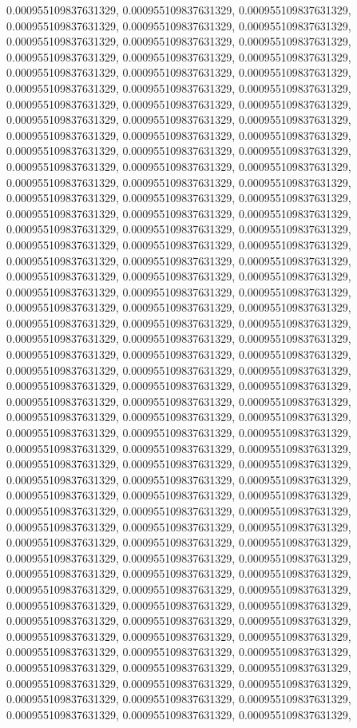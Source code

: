 \documentclass[
  ,man]{apa6}
\begin{document}
0.000955109837631329, 0.000955109837631329, 0.000955109837631329, 0.000955109837631329, 0.000955109837631329, 0.000955109837631329, 0.000955109837631329, 0.000955109837631329, 0.000955109837631329, 0.000955109837631329, 0.000955109837631329, 0.000955109837631329, 0.000955109837631329, 0.000955109837631329, 0.000955109837631329, 0.000955109837631329, 0.000955109837631329, 0.000955109837631329, 0.000955109837631329, 0.000955109837631329, 0.000955109837631329, 0.000955109837631329, 0.000955109837631329,
0.000955109837631329, 0.000955109837631329, 0.000955109837631329, 0.000955109837631329, 0.000955109837631329, 0.000955109837631329, 0.000955109837631329, 0.000955109837631329, 0.000955109837631329, 0.000955109837631329, 0.000955109837631329, 0.000955109837631329, 0.000955109837631329, 0.000955109837631329, 0.000955109837631329, 0.000955109837631329, 0.000955109837631329, 0.000955109837631329, 0.000955109837631329, 0.000955109837631329, 0.000955109837631329, 0.000955109837631329, 0.000955109837631329,
0.000955109837631329, 0.000955109837631329, 0.000955109837631329, 0.000955109837631329, 0.000955109837631329, 0.000955109837631329, 0.000955109837631329, 0.000955109837631329, 0.000955109837631329, 0.000955109837631329, 0.000955109837631329, 0.000955109837631329, 0.000955109837631329, 0.000955109837631329, 0.000955109837631329, 0.000955109837631329, 0.000955109837631329, 0.000955109837631329, 0.000955109837631329, 0.000955109837631329, 0.000955109837631329, 0.000955109837631329, 0.000955109837631329,
0.000955109837631329, 0.000955109837631329, 0.000955109837631329, 0.000955109837631329, 0.000955109837631329, 0.000955109837631329, 0.000955109837631329, 0.000955109837631329, 0.000955109837631329, 0.000955109837631329, 0.000955109837631329, 0.000955109837631329, 0.000955109837631329, 0.000955109837631329, 0.000955109837631329, 0.000955109837631329, 0.000955109837631329, 0.000955109837631329, 0.000955109837631329, 0.000955109837631329, 0.000955109837631329, 0.000955109837631329, 0.000955109837631329,
0.000955109837631329, 0.000955109837631329, 0.000955109837631329, 0.000955109837631329, 0.000955109837631329, 0.000955109837631329, 0.000955109837631329, 0.000955109837631329, 0.000955109837631329, 0.000955109837631329, 0.000955109837631329, 0.000955109837631329, 0.000955109837631329, 0.000955109837631329, 0.000955109837631329, 0.000955109837631329, 0.000955109837631329, 0.000955109837631329, 0.000955109837631329, 0.000955109837631329, 0.000955109837631329, 0.000955109837631329, 0.000955109837631329,
0.000955109837631329, 0.000955109837631329, 0.000955109837631329, 0.000955109837631329, 0.000955109837631329, 0.000955109837631329, 0.000955109837631329, 0.000955109837631329, 0.000955109837631329, 0.000955109837631329, 0.000955109837631329, 0.000955109837631329, 0.000955109837631329, 0.000955109837631329, 0.000955109837631329, 0.000955109837631329, 0.000955109837631329, 0.000955109837631329, 0.000955109837631329, 0.000955109837631329, 0.000955109837631329, 0.000955109837631329, 0.000955109837631329,
\end{document}
